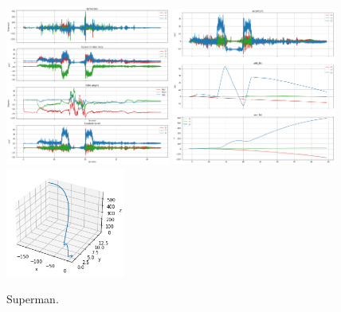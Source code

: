 \documentclass[%
 reprint,
 amsmath,amssymb,
 aps,
]{revtex4-2}
\begin{document}
\begin{figure}[H]
\includegraphics[width=0.48\textwidth]{superman.png}
\includegraphics[width=0.48\textwidth]{superman_integrate.png}
\includegraphics[width=0.35\textwidth]{superman_path.png}
\caption{\label{superman}Superman.}
\end{figure}
\end{document}
